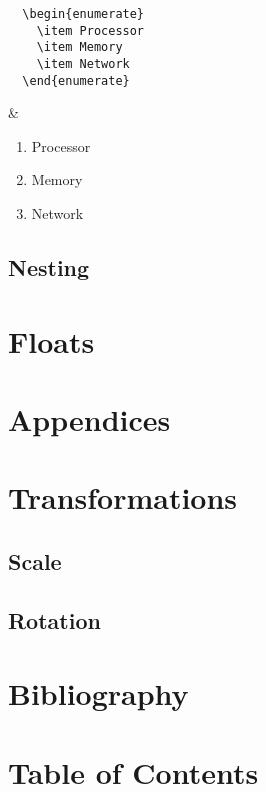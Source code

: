 \begin{latexdemo}
  \begin{verbatim}
  \begin{enumerate}
    \item Processor
    \item Memory
    \item Network
  \end{enumerate}
  \end{verbatim}
  &
  \begin{enumerate}
    \item Processor
    \item Memory
    \item Network
  \end{enumerate}
\end{latexdemo}

\subsection{Nesting}

\section{Floats}


\section{Appendices}

\section{Transformations}
\subsection{Scale}
\subsection{Rotation}

\section{Bibliography}
\section{Table of Contents}
